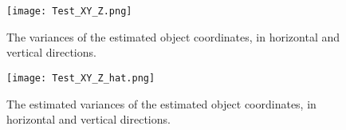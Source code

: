 \begin{figure}
  \centering
  \texttt{[image: Test\_XY\_Z.png]}
  \caption{\small The variances of the estimated object coordinates, in horizontal and vertical directions.}
  \label{fig:TestSigmxx}
  \vspace{1cm}
  \centering
  \texttt{[image: Test\_XY\_Z\_hat.png]}
  \caption{\small The estimated variances of the estimated object coordinates, in horizontal and vertical directions.}
  \label{fig:TestSigmxxhat}
\end{figure}


